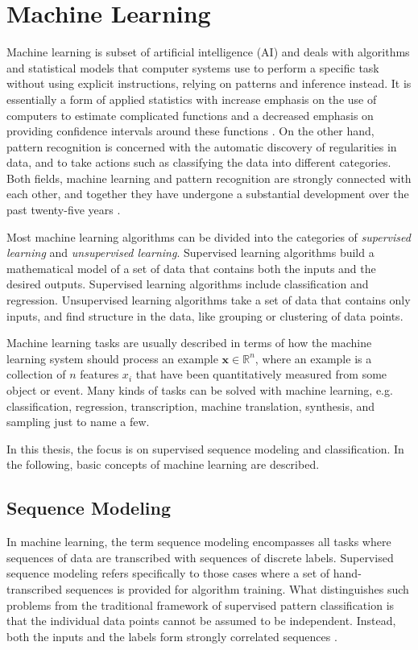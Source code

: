 \documentclass{scrartcl}
\begin{document}
\newpage

\section{Machine Learning}

Machine learning is subset of artificial intelligence (AI) and deals with algorithms and statistical models that computer systems use to perform a specific task without using explicit instructions, relying on patterns and inference instead. It is essentially a form of applied statistics with increase emphasis on the use of computers to estimate complicated functions and a decreased emphasis on providing confidence intervals around these functions \cite{Goodfellow2016}. On the other hand, pattern recognition is concerned with the automatic discovery of regularities in data, and to take actions such as classifying the data into different categories. Both fields, machine learning and pattern recognition are strongly connected with each other, and together they have undergone a substantial development over the past twenty-five years \cite{Bishop2006}.

Most machine learning algorithms can be divided into the categories of \emph{supervised learning} and \emph{unsupervised learning}. Supervised learning algorithms build a mathematical model of a set of data that contains both the inputs and the desired outputs. Supervised learning algorithms include classification and regression. Unsupervised learning algorithms take a set of data that contains only inputs, and find structure in the data, like grouping or clustering of data points. 

Machine learning tasks are usually described in terms of how the machine learning system should process an example $\mathbf x \in \mathbb R^n$, where an example is a collection of $n$ features $x_i$ that have been quantitatively measured from some object or event. Many kinds of tasks can be solved with machine learning, e.g. classification, regression, transcription, machine translation, synthesis, and sampling just to name a few.

In this thesis, the focus is on supervised sequence modeling and classification. In the following, basic concepts of machine learning are described. 

\subsection{Sequence Modeling}
In machine learning, the term sequence modeling encompasses all tasks where sequences of data are transcribed with sequences of discrete labels. Supervised sequence modeling refers specifically to those cases where a set of hand-transcribed sequences is provided for algorithm training. What distinguishes such problems from the traditional framework of supervised pattern classification is that the individual data points cannot be assumed to be independent. Instead, both the inputs and the labels form strongly correlated sequences \cite{Graves2012}.
\end{document}
